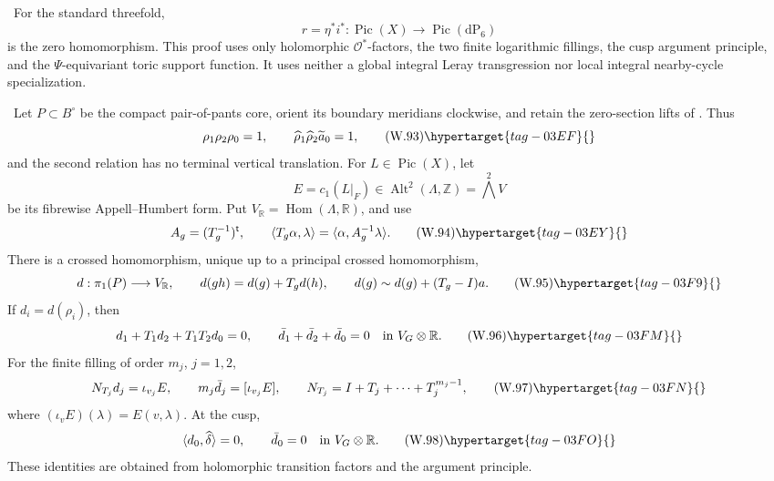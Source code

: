 
\begin{theorem}
\hypertarget{tag-03IW}{}\label{wbII:thm:analytic-all-picard}


\ For the standard threefold,
\[
 r=\eta^*i^*:\operatorname{Pic}(X)\longrightarrow
 \operatorname{Pic}(\mathrm{dP}_6)
\]
is the zero homomorphism.  This proof uses only holomorphic
\(\mathcal O^*\)-factors, the two finite logarithmic fillings, the cusp
argument principle, and the \(\Psi\)-equivariant toric support function.
It uses neither a global integral Leray transgression nor local integral
nearby-cycle specialization.
\end{theorem}

\begin{proposition}
\hypertarget{tag-03IH}{}\label{wbII:prop:analytic-ah-boundary}


\ Let \(P\subset B^\circ\) be the compact pair-of-pants core,
orient its boundary meridians clockwise, and retain the zero-section lifts
of .  Thus
\[
 \rho_1\rho_2\rho_0=1,
 \qquad
 \widehat\rho_1\widehat\rho_2\widetilde a_0=1,
\tag{W.93}\hypertarget{tag-03EF}{}\label{wbII:eq:W:5.17-A1}
\]
and the second relation has no terminal vertical translation.  For
\(L\in\operatorname{Pic}(X)\), let
\[
 E=c_1(L|_F)\in\operatorname{Alt}^2(\Lambda,\mathbb Z)
   =\bigwedge^2V
\]
be its fibrewise Appell--Humbert form.  Put
\(V_{\mathbb R}=\operatorname{Hom}(\Lambda,\mathbb R)\), and use
\[
 A_g=(T_g^{-1})^{\mathsf t},
 \qquad
 \langle T_g\alpha,\lambda\rangle
 =\langle\alpha,A_g^{-1}\lambda\rangle.
\tag{W.94}\hypertarget{tag-03EY}{}\label{wbII:eq:W:5.17-A2}
\]
There is a crossed homomorphism, unique up to a principal crossed
homomorphism,
\[
 d:\pi_1(P)\longrightarrow V_{\mathbb R},
 \qquad
 d(gh)=d(g)+T_gd(h),
 \qquad
 d(g)\sim d(g)+(T_g-I)a.
\tag{W.95}\hypertarget{tag-03F9}{}\label{wbII:eq:W:5.17-A3}
\]
If \(d_i=d(\rho_i)\), then
\[
 d_1+T_1d_2+T_1T_2d_0=0,
 \qquad
 \bar d_1+\bar d_2+\bar d_0=0
 \quad\text{in }V_G\otimes\mathbb R.
\tag{W.96}\hypertarget{tag-03FM}{}\label{wbII:eq:W:5.17-A4}
\]
For the finite filling of order \(m_j\), \(j=1,2\),
\[
 N_{T_j}d_j=\iota_{v_j}E,
 \qquad
 m_j\bar d_j=[\iota_{v_j}E],
 \qquad
 N_{T_j}=I+T_j+\cdots+T_j^{m_j-1},
\tag{W.97}\hypertarget{tag-03FN}{}\label{wbII:eq:W:5.17-A5}
\]
where \((\iota_vE)(\lambda)=E(v,\lambda)\).  At the cusp,
\[
 \langle d_0,\widehat\delta\rangle=0,
 \qquad
 \bar d_0=0\quad\text{in }V_G\otimes\mathbb R.
\tag{W.98}\hypertarget{tag-03FO}{}\label{wbII:eq:W:5.17-A6}
\]
These identities are obtained from holomorphic transition factors and the
argument principle.
\end{proposition}

